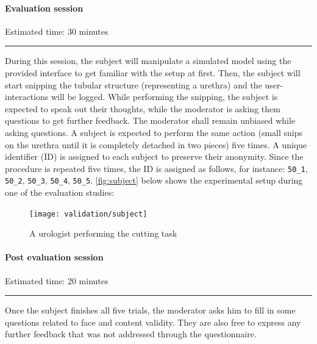 \paragraph{Evaluation session}
Estimated time: 30 minutes\\[-2ex]
\hrule%
During this session, the subject will manipulate a simulated model using the provided interface to get familiar with the setup at first. Then, the subject will start snipping the tubular structure (representing a urethra) and the user-interactions will be logged.
While performing the snipping, the subject is expected to speak out their thoughts, while the moderator is asking them questions to get further feedback. The moderator shall remain unbiased while asking questions.
A subject is expected to perform the same action (small snips on the urethra until it is completely detached in two pieces) five times.
A unique identifier (ID) is assigned to each subject to preserve their anonymity. Since the procedure is repeated five times, the ID is assigned as follows, for instance: \texttt{50\_1}, \texttt{50\_2}, \texttt{50\_3}, \texttt{50\_4}, \texttt{50\_5}. \autoref{fig:subject} below shows the experimental setup during one of the evaluation studies:

\begin{figure}
  \centering
  \texttt{[image: validation/subject]}
  \caption{A urologist performing the cutting task}
  \label{fig:subject}
\end{figure}

\paragraph{Post evaluation session}
Estimated time: 20 minutes\\[-2ex]
\hrule%
Once the subject finishes all five trials, the moderator asks him to fill in some questions related to face and content validity. They are also free to express any further feedback that was not addressed through the questionnaire.


\clearpage%
